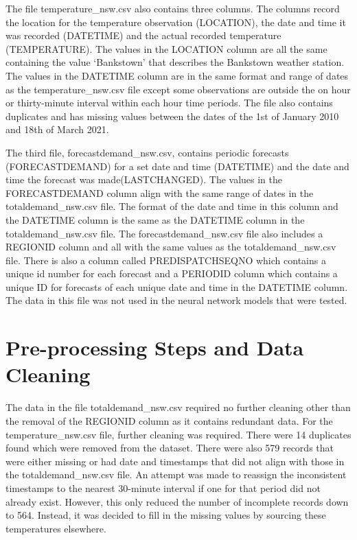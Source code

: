 \documentclass[mstat,12pt]{unswthesis}
\begin{document}
\bigskip

The file temperature\_nsw.csv also contains three columns. The columns
record the location for the temperature observation (LOCATION), the date
and time it was recorded (DATETIME) and the actual recorded temperature
(TEMPERATURE). The values in the LOCATION column are all the same
containing the value `Bankstown' that describes the Bankstown weather
station. The values in the DATETIME column are in the same format and
range of dates as the temperature\_nsw.csv file except some observations
are outside the on hour or thirty-minute interval within each hour time
periods. The file also contains duplicates and has missing values
between the dates of the 1st of January 2010 and 18th of March 2021.

\bigskip

The third file, forecastdemand\_nsw.csv, contains periodic forecasts
(FORECASTDEMAND) for a set date and time (DATETIME) and the date and
time the forecast was made(LASTCHANGED). The values in the
FORECASTDEMAND column align with the same range of dates in the
totaldemand\_nsw.csv file. The format of the date and time in this
column and the DATETIME column is the same as the DATETIME column in the
totaldemand\_nsw.csv file. The forecastdemand\_nsw.csv file also
includes a REGIONID column and all with the same values as the
totaldemand\_nsw.csv file. There is also a column called
PREDISPATCHSEQNO which contains a unique id number for each forecast and
a PERIODID column which contains a unique ID for forecasts of each
unique date and time in the DATETIME column. The data in this file was
not used in the neural network models that were tested.

\hypertarget{pre-processing-steps-and-data-cleaning}{%
\section{Pre-processing Steps and Data
Cleaning}\label{pre-processing-steps-and-data-cleaning}}

The data in the file totaldemand\_nsw.csv required no further cleaning
other than the removal of the REGIONID column as it contains redundant
data. For the temperature\_nsw.csv file, further cleaning was required.
There were 14 duplicates found which were removed from the dataset.
There were also 579 records that were either missing or had date and
timestamps that did not align with those in the totaldemand\_nsw.csv
file. An attempt was made to reassign the inconsistent timestamps to the
nearest 30-minute interval if one for that period did not already exist.
However, this only reduced the number of incomplete records down to 564.
Instead, it was decided to fill in the missing values by sourcing these
temperatures elsewhere.
\end{document}
